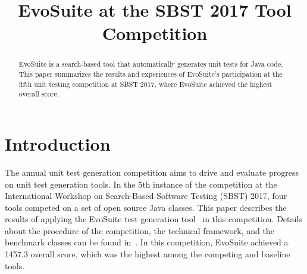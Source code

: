 \documentclass[10pt,conference]{IEEEtran}
\newcommand{\EVOSUITE}{{\sc EvoSuite}\xspace}
\begin{document}
% 

\title{EvoSuite at the SBST 2017 Tool Competition}
 

\author{
\and
{}
}

\maketitle

\begin{abstract}
  \EVOSUITE is a search-based tool that automatically generates unit
  tests for Java code.  This paper summarizes the results and
  experiences of \EVOSUITE's participation at the fifth unit testing
  competition at SBST 2017, where \EVOSUITE achieved the highest
  overall score.
\end{abstract}



\section{Introduction}
The annual unit test generation competition aims to drive and evaluate
progress on unit test generation tools. In the 5th instance of the
competition at the International Workshop on Search-Based Software
Testing (SBST) 2017, four tools competed on a set of open source Java
classes. This paper describes the results of applying the \EVOSUITE
test generation tool~\cite{FrA11c} in this competition. Details about
the procedure of the competition, the technical framework, and the
benchmark classes can be found in~\cite{sbst17competition}.  In this
competition, \EVOSUITE achieved a 1457.3 overall score, which was the
highest among the competing and baseline tools.

\end{document}
